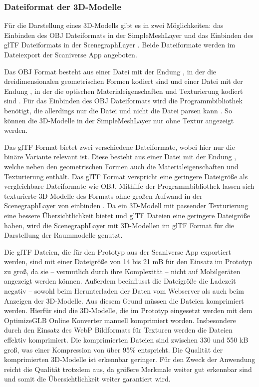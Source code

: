 \subsubsection{Dateiformat der 3D-Modelle}\label{sec:ModelFileFormat}
Für die Darstellung eines 3D-Modells gibt es in \deckgl{} zwei Möglichkeiten: das Einbinden des \ac{OBJ} Dateiformats in der SimpleMeshLayer \cite{DeckglSimpleMeshLayer} und das Einbinden des \ac{glTF} Dateiformats in der ScenegraphLayer \cite{DeckglScenegraphLayer}. Beide Dateiformate werden im Dateiexport der Scaniverse App angeboten.

Das \ac{OBJ} Format besteht aus einer Datei mit der Endung \obj{}, in der die dreidimensionalen geometrischen Formen kodiert sind \cite{OBJSpec} und einer Datei mit der Endung \mtl{}, in der die optischen Materialeigenschaften und Texturierung kodiert sind \cite{MTLSpec}. Für das Einbinden des \ac{OBJ} Dateiformats wird die \loadersgl{} Programmbibliothek benötigt, die allerdings nur die \obj{} Datei und nicht die \mtl{} Datei parsen kann \cite{OBJLoader}. So können die 3D-Modelle in der SimpleMeshLayer nur ohne Textur angezeigt werden.

Das \ac{glTF} Format bietet zwei verschiedene Dateiformate, wobei hier nur die binäre Variante relevant ist. Diese besteht aus einer Datei mit der Endung \glb{}, welche neben den geometrischen Formen auch die Materialeigenschaften und Texturierung enthält. Das \ac{glTF} Format verspricht eine geringere Dateigröße als vergleichbare Dateiformate wie \ac{OBJ}.\cite[Abschnitt 2]{glTFSpec} Mithilfe der \loadersgl{} Programmbibliothek lassen sich texturierte 3D-Modelle des Formats ohne großen Aufwand in der ScenegraphLayer von \deckgl{} einbinden \cite{DeckglScenegraphLayer}. Da ein 3D-Modell mit passender Texturierung eine bessere Übersichtlichkeit bietet und \ac{glTF} Dateien eine geringere Dateigröße haben, wird die ScenegraphLayer mit 3D-Modellen im \ac{glTF} Format für die Darstellung der Raummodelle genutzt.

Die \ac{glTF} Dateien, die für den Prototyp aus der Scaniverse App exportiert werden, sind mit einer Dateigröße von 14 bis 21 \ac{mB} für den Einsatz im Prototyp zu groß, da sie – vermutlich durch ihre Komplexität – nicht auf Mobilgeräten angezeigt werden können. Außerdem beeinflusst die Dateigröße die Ladezeit negativ – sowohl beim Herunterladen der Daten vom Webserver als auch beim Anzeigen der 3D-Modelle. Aus diesem Grund müssen die Dateien komprimiert werden. Hierfür sind die 3D-Modelle, die im Prototyp eingesetzt werden mit dem OptimizeGLB Online Konverter \cite{OptimizeGLB} manuell komprimiert worden. Insbesondere durch den Einsatz des \ac{WebP} Bildformats für Texturen werden die Dateien effektiv komprimiert. Die komprimierten Dateien sind zwischen 330 und 550 \ac{kB} groß, was einer Kompression von über 95\% entspricht. Die Qualität der komprimierten 3D-Modelle ist erkennbar geringer. Für den Zweck der Anwendung reicht die Qualität trotzdem aus, da größere Merkmale weiter gut erkennbar sind und somit die Übersichtlichkeit weiter garantiert wird.

